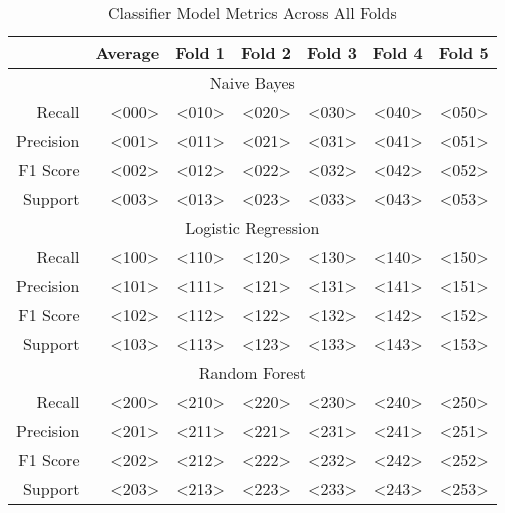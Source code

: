 \begin{table}[h]
    \centering
    \begin{tabular}{r|r|r|r|r|r|r}
        & Average & Fold 1 & Fold 2 & Fold 3 & Fold 4 & Fold 5 \\\hline
        \multicolumn{7}{c}{Naive Bayes} \\\hline
        Recall      & <000> & <010> & <020> & <030> & <040> & <050> \\
        Precision   & <001> & <011> & <021> & <031> & <041> & <051> \\
        F1 Score    & <002> & <012> & <022> & <032> & <042> & <052> \\
        Support     & <003> & <013> & <023> & <033> & <043> & <053> \\\hline
        \multicolumn{7}{c}{Logistic Regression} \\\hline
        Recall      & <100> & <110> & <120> & <130> & <140> & <150> \\
        Precision   & <101> & <111> & <121> & <131> & <141> & <151> \\
        F1 Score    & <102> & <112> & <122> & <132> & <142> & <152> \\
        Support     & <103> & <113> & <123> & <133> & <143> & <153> \\\hline
        \multicolumn{7}{c}{Random Forest} \\\hline
        Recall      & <200> & <210> & <220> & <230> & <240> & <250> \\
        Precision   & <201> & <211> & <221> & <231> & <241> & <251> \\
        F1 Score    & <202> & <212> & <222> & <232> & <242> & <252> \\
        Support     & <203> & <213> & <223> & <233> & <243> & <253> \\\hline
    \end{tabular}
    \caption{Classifier Model Metrics Across All Folds}
    \label{tab:combined_model_metrics_folds}
\end{table}